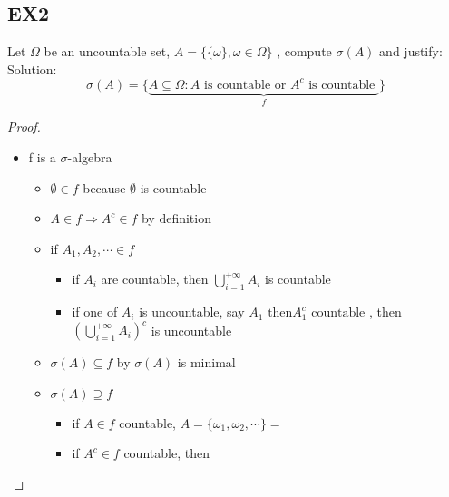   \subsection*{EX2}
  Let $ \Omega $ be an uncountable set, $ A=\{\{\omega\},\omega\in\Omega\} $ , compute $ \sigma(A) $ and justify:
\\Solution:
$$
    \sigma(A)=\{\underbrace{A\subseteq \Omega: A \text{ is countable or }A^c \text{ is countable }}_{f}\}
$$     
\begin{proof}
    \begin{itemize}
    \item f is a $ \sigma $-algebra 
     \begin{itemize}
    \item $\emptyset \in f$ because $\emptyset$ is countable
    \item $ A\in f \Rightarrow A^c\in f $ by definition
    \item if $ A_1,A_2,\cdots \in f $ \begin{itemize}
    \item if $ A_i $ are countable, then $ \bigcup_{i=1}^{+\infty}A_i $ is countable
    \item if one of $ A_i $ is uncountable, say $ A_1 \text{ then} A_1^c \text{ countable }$, then $ (\bigcup_{i=1}^{+\infty}A_i)^c $ is uncountable
    \end{itemize}
    \item $\sigma(A)\subseteq f $ by $ \sigma(A) $ is minimal
    \item $\sigma(A)\supseteq f $ \begin{itemize}
    \item if $ A\in f $ countable, $ A=\{\omega_1,\omega_2,\cdots\}= $
    \item if $ A^c\in f $ countable, then
    \end{itemize}
    \end{itemize}
    \end{itemize}
\end{proof}
